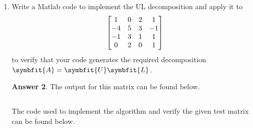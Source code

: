 \documentclass{article}
\theoremstyle{definition}
\newtheorem*{answer}{Answer}
\newcommand{\mat}[1]{\symbfit{#1}}
\begin{document}
\begin{enumerate}[leftmargin=\labelsep]
\begin{enumerate}
\begin{answer}
\begin{proof}
\begin{itemize}
\begin{align*}
							            \shortintertext{which exist by assumption, we have}
							            \mat{A}       & = \mqty[\mat{U}_1     & \vec{l} \\\vec{0}^\top & 1]\mqty[\mat{L}_1 & \vec{0} \\\vec{c}^\top&\alpha_{nn}],
						            \end{align*}
						            where \(\vec{l} = \vec{a} / \alpha_{nn}\). Note, then that \(0 \neq \det(\mat{A}) = \det(\mat{L}_1) \alpha_{nn}\), so \(\alpha_{nn} \neq 0\), and the lower triangular matrix is nonsingular.
				            \end{itemize}
			            \end{proof}
		            \end{answer}

		      \item Write a Matlab code to implement the UL decomposition and apply it to
		            \[
			            \mqty[1&0&2&1\\-4&5&3&-1\\-1&3&1&1\\0&2&0&1]
		            \]
		            to verify that your code generates the required decomposition \(\mat{A} = \mat{U}\mat{L}\).
		            \begin{answer}
			            The output for this matrix can be found below.
			            \begin{mdframed}[backgroundcolor=lightgray]
				            \setlength{\lineskip}{0pt}
				            \inputminted{text}{out/output5.txt}
			            \end{mdframed}
			            The code used to implement the algorithm and verify the given test matrix can be found below.
			            \begin{mdframed}[backgroundcolor=lightgray]
			            \end{mdframed}
		            \end{answer}
	      \end{enumerate}


\end{enumerate}
\end{document}
